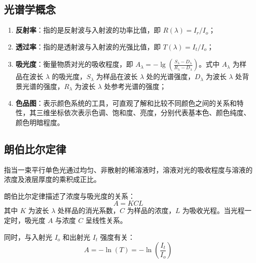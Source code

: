 \subsection{光谱学概念}
\begin{enumerate}[label=\arabic*、, leftmargin=4em, labelsep=0pt]
    \item \textbf{反射率}：指的是反射波与入射波的功率比值，即 $R(\lambda) = I_r / I_o$；
    \item \textbf{透过率}：指的是透射波与入射波的光强比值，即 $T(\lambda) = I_t / I_o$；
    \item \textbf{吸光度}：衡量物质对光的吸收程度，即 $A_\lambda = -\lg\left(\frac{S_\lambda - D_\lambda}{R_\lambda - D_\lambda}\right)$。式中 $A_\lambda$ 为样品在波长 $\lambda$ 的吸光度，$S_\lambda$ 为样品在波长 $\lambda$ 处的光谱强度，$D_\lambda$ 为波长 $\lambda$ 处背景光谱的强度，$R_\lambda$ 为波长 $\lambda$ 处参考光谱的强度；
    \item \textbf{色品图}：表示颜色系统的工具，可直观了解和比较不同颜色之间的关系和特性，其三维坐标依次表示色调、饱和度、亮度，分别代表基本色、颜色纯度、颜色明暗程度。
\end{enumerate}


\subsection{朗伯比尔定律}
指当一束平行单色光通过均匀、非散射的稀溶液时，溶液对光的吸收程度与溶液的浓度及液层厚度的乘积成正比。


朗伯比尔定律描述了浓度与吸光度的关系：
\begin{equation}
    A = K C L
\end{equation}
其中 $K$ 为波长 $\lambda$ 处样品的消光系数，$C$ 为样品的浓度，$L$ 为吸收光程。当光程一定时，吸光度 $A$ 与浓度 $C$ 呈线性关系。

同时，与入射光 $I_o$ 和出射光 $I_t$ 强度有关：
\begin{equation}
    A = -\ln(T) = -\ln\left(\frac{I_t}{I_o}\right)
\end{equation}

